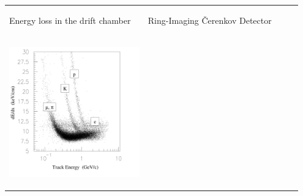 \documentclass[landscape]{article}
\newenvironment{slide}{\mbox{ }\vfill}{\vfill \mbox{ } \pagebreak}
\begin{document}
\begin{slide}
\begin{center}
  \begin{tabular}{p{0.45\linewidth} p{0.5\linewidth}}
    \begin{center} Energy loss in the drift chamber \end{center} &
    \begin{center} Ring-Imaging \v{C}erenkov Detector \end{center} \\
    \begin{minipage}{\linewidth} \vspace{-0.5 cm} \begin{center} \includegraphics[height=12.5 cm]{dedx} \end{center} \end{minipage} &

\end{tabular}
\end{center}
\end{slide}
\end{document}
